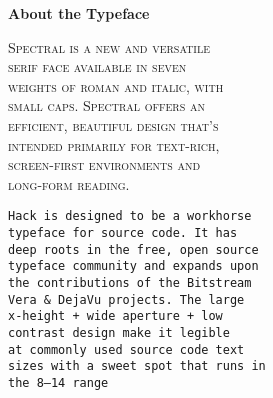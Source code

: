 \begin{center}
{\Large\textbf{About the Typeface}}

\entryskip

\begin{minipage}{0.5\textwidth}\small
\noindent\textsc{Spectral is a new and versatile \\ serif face available in seven \\ weights of roman and italic, with \\ small caps.
Spectral offers an \\ efficient, beautiful design that’s \\ intended primarily for text-rich, \\ screen-first environments and\\ long-form reading.}

\entryskip

\texttt{Hack is designed to be a workhorse \\ typeface for source code.
It has \\ deep roots in the free, open source \\ typeface community and expands upon \\ the contributions of the Bitstream \\ Vera \& DejaVu projects.
The large \\ x-height + wide aperture + low \\ contrast design make it legible \\ at commonly used source code text \\ sizes with a sweet spot that runs in \\ the 8--14 range}
\end{minipage}
\end{center}


